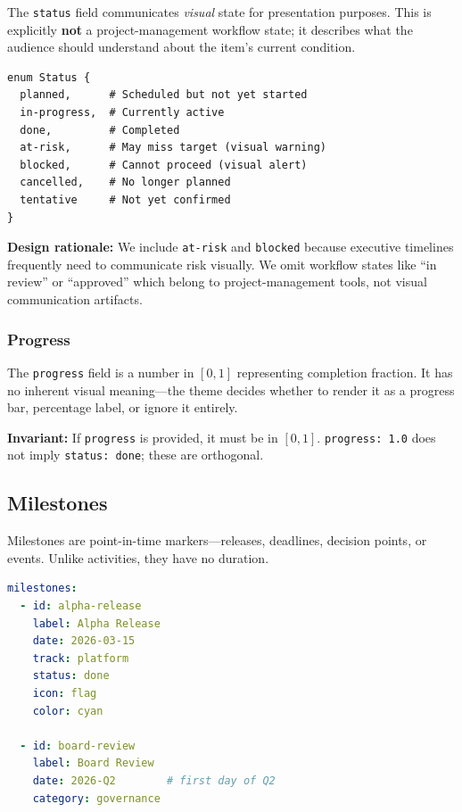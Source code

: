 The \texttt{status} field communicates \emph{visual} state for presentation purposes.
This is explicitly \textbf{not} a project-management workflow state; it describes what
the audience should understand about the item's current condition.

\begin{lstlisting}
enum Status {
  planned,      # Scheduled but not yet started
  in-progress,  # Currently active
  done,         # Completed
  at-risk,      # May miss target (visual warning)
  blocked,      # Cannot proceed (visual alert)
  cancelled,    # No longer planned
  tentative     # Not yet confirmed
}
\end{lstlisting}

\textbf{Design rationale:} We include \texttt{at-risk} and \texttt{blocked} because executive
timelines frequently need to communicate risk visually. We omit workflow states like
``in review'' or ``approved'' which belong to project-management tools, not visual
communication artifacts.

\subsubsection{Progress}

The \texttt{progress} field is a number in $[0, 1]$ representing completion fraction.
It has no inherent visual meaning---the theme decides whether to render it as a
progress bar, percentage label, or ignore it entirely.

\textbf{Invariant:} If \texttt{progress} is provided, it must be in $[0, 1]$.
\texttt{progress: 1.0} does not imply \texttt{status: done}; these are orthogonal.


\subsection{Milestones}
\label{sec:ir-milestones}

Milestones are point-in-time markers---releases, deadlines, decision points, or events.
Unlike activities, they have no duration.

\begin{lstlisting}[language=yaml,caption={Milestone examples}]
milestones:
  - id: alpha-release
    label: Alpha Release
    date: 2026-03-15
    track: platform
    status: done
    icon: flag
    color: cyan

  - id: board-review
    label: Board Review
    date: 2026-Q2        # first day of Q2
    category: governance
\end{lstlisting}

